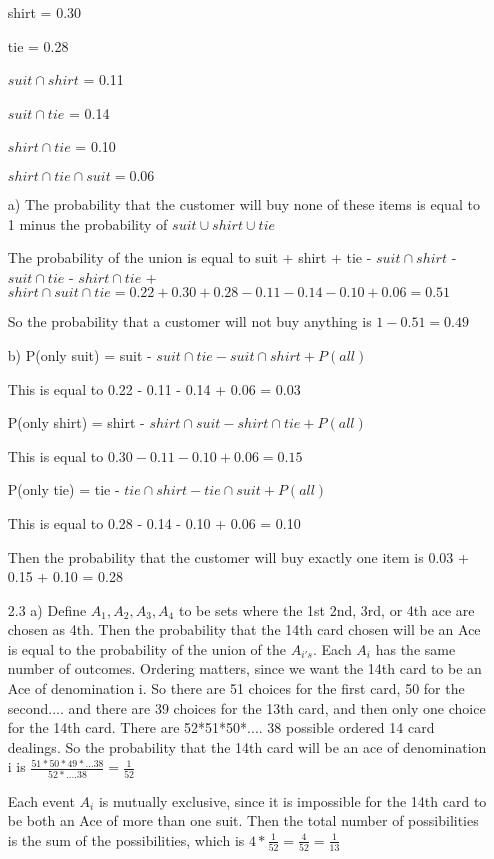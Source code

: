 \documentclass[11pt]{article}
\begin{document}
\begin{itemize}
	shirt	= 0.30
	
	tie		= 0.28

	$suit \cap shirt$	= 0.11

	$suit \cap tie$	= 0.14

	$shirt \cap tie$	= 0.10

	$shirt \cap tie \cap suit = 0.06$

	a) The probability that the customer will buy none of these items is equal to 1 minus the probability of $suit \cup shirt \cup tie$

	The probability of the union is equal to suit + shirt + tie - $suit\cap shirt$ - $suit\cap tie$ - $shirt\cap tie$ + $shirt \cap suit \cap tie = 0.22 + 0.30 + 0.28 - 0.11 - 0.14 - 0.10 + 0.06 = 0.51$

	So the probability that a customer will not buy anything is $1 - 0.51 = 0.49$

	b) P(only suit) = suit - $suit \cap tie - suit \cap shirt + P(all)$

	This is equal to 0.22 - 0.11 - 0.14 + 0.06 = 0.03

		 P(only shirt) = shirt - $shirt \cap suit - shirt \cap tie + P(all)$

		 This is equal to $0.30 - 0.11 - 0.10 + 0.06 = 0.15$

		 P(only tie) = tie - $tie \cap shirt - tie \cap suit + P(all)$

	This is equal to 0.28 - 0.14 - 0.10 + 0.06 = 0.10

	Then the probability that the customer will buy exactly one item is 0.03 + 0.15 + 0.10 = 0.28


\item[2.3]
	a) 
	Define $A_1, A_2, A_3, A_4$ to be sets where the 1st 2nd, 3rd, or 4th ace are chosen as 4th. Then the probability that the 14th card chosen will be an Ace is equal to the probability of the union of the $A_{i's}$. Each $A_i$ has the same number of outcomes. Ordering matters, since we want the 14th card to be an Ace of denomination i. So there are 51 choices for the first card, 50 for the second.... and there are 39 choices for the 13th card, and then only one choice for the 14th card. There are 52*51*50*.... 38 possible ordered 14 card dealings. So the probability that the 14th card will be an ace of denomination i is $\frac{51*50*49*...38}{52*....38} = \frac{1}{52}$	

	Each event $A_i$ is mutually exclusive, since it is impossible for the 14th card to be both an Ace of more than one suit. Then the total number of possibilities is the sum of the possibilities, which is $4 * \frac{1}{52} = \frac{4}{52} = \frac{1}{13}$


\end{itemize}
\end{document}
